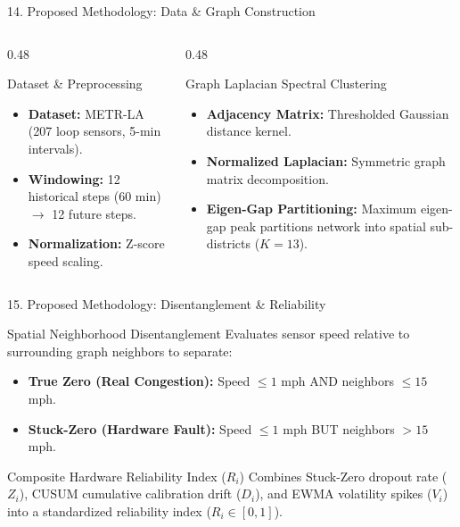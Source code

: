 \documentclass[aspectratio=169, 10pt]{beamer}
\begin{document}
\begin{frame}{14. Proposed Methodology: Data \& Graph Construction}
  \begin{columns}
    \begin{column}{0.48\textwidth}
      \begin{block}{Dataset \& Preprocessing}
        \begin{itemize}
          \item \textbf{Dataset:} METR-LA (207 loop sensors, 5-min intervals).
          \item \textbf{Windowing:} 12 historical steps (60 min) $\to$ 12 future steps.
          \item \textbf{Normalization:} Z-score speed scaling.
        \end{itemize}
      \end{block}
    \end{column}
    \begin{column}{0.48\textwidth}
      \begin{block}{Graph Laplacian Spectral Clustering}
        \begin{itemize}
          \item \textbf{Adjacency Matrix:} Thresholded Gaussian distance kernel.
          \item \textbf{Normalized Laplacian:} Symmetric graph matrix decomposition.
          \item \textbf{Eigen-Gap Partitioning:} Maximum eigen-gap peak partitions network into spatial sub-districts ($K=13$).
        \end{itemize}
      \end{block}
    \end{column}
  \end{columns}
\end{frame}

\begin{frame}{15. Proposed Methodology: Disentanglement \& Reliability}
  \begin{block}{Spatial Neighborhood Disentanglement}
    Evaluates sensor speed relative to surrounding graph neighbors to separate:
    \begin{itemize}
      \item \textbf{True Zero (Real Congestion):} Speed $\le 1$ mph AND neighbors $\le 15$ mph.
      \item \textbf{Stuck-Zero (Hardware Fault):} Speed $\le 1$ mph BUT neighbors $> 15$ mph.
    \end{itemize}
  \end{block}
  
  \vspace{0.2cm}
  
  \begin{block}{Composite Hardware Reliability Index ($R_i$)}
    Combines Stuck-Zero dropout rate ($Z_i$), CUSUM cumulative calibration drift ($D_i$), and EWMA volatility spikes ($V_i$) into a standardized reliability index ($R_i \in [0, 1]$).
  \end{block}
\end{frame}
\end{document}
